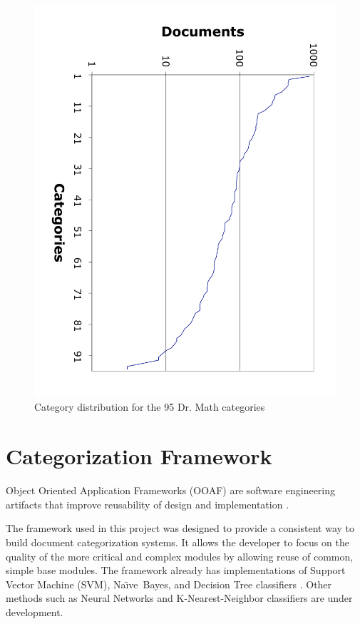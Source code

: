 \documentclass[twocolumn]{article}
\newcommand{\naive}{Na\"\i ve}
\begin{document}
\begin{figure}
\includegraphics[angle=90,width=\linewidth]{cat-distribution}
\caption{Category distribution for the 95 Dr. Math categories}
\label{cat-distribution}
\end{figure}


\section{Categorization Framework}

Object Oriented Application Frameworks (OOAF) are software engineering artifacts 
that improve reusability of design and implementation \cite{fayad:97, fayad:99}.

The framework used in this project was designed to provide a
consistent way to build document categorization
systems.\cite{williams:02} It allows the developer to focus on the
quality of the more critical and complex modules by allowing reuse of
common, simple base modules.  The framework already has
implementations of Support Vector Machine (SVM), \naive\ Bayes, and
Decision Tree classifiers \cite{yang:99, sebastiani:02}. Other methods
such as Neural Networks \cite{calvo:00, calvo:01} and
K-Nearest-Neighbor classifiers are under development.
\end{document}
